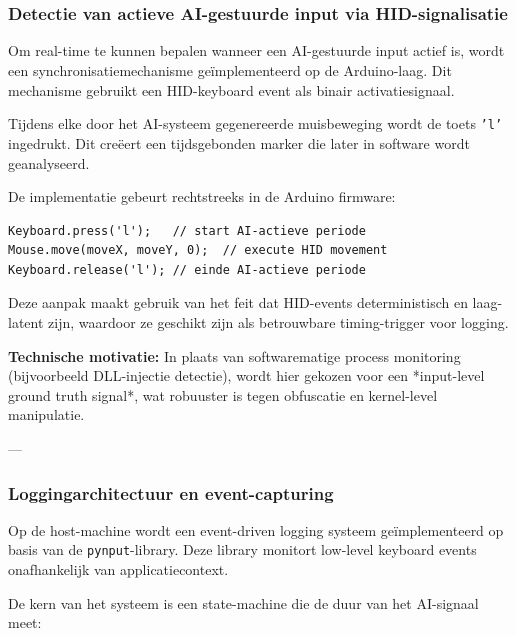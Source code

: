 \chapter{}
\label{ch:Detectie-van-valsspelen-via-machine-learning}

\subsection{Detectie van actieve AI-gestuurde input via HID-signalisatie}

Om real-time te kunnen bepalen wanneer een AI-gestuurde input actief is, wordt een synchronisatiemechanisme geïmplementeerd op de Arduino-laag. Dit mechanisme gebruikt een HID-keyboard event als binair activatiesignaal.

Tijdens elke door het AI-systeem gegenereerde muisbeweging wordt de toets \texttt{'l'} ingedrukt. Dit creëert een tijdsgebonden marker die later in software wordt geanalyseerd.

De implementatie gebeurt rechtstreeks in de Arduino firmware:

\begin{verbatim}
Keyboard.press('l');   // start AI-actieve periode
Mouse.move(moveX, moveY, 0);  // execute HID movement
Keyboard.release('l'); // einde AI-actieve periode
\end{verbatim}

Deze aanpak maakt gebruik van het feit dat HID-events deterministisch en laag-latent zijn, waardoor ze geschikt zijn als betrouwbare timing-trigger voor logging.

\textbf{Technische motivatie:}
In plaats van softwarematige process monitoring (bijvoorbeeld DLL-injectie detectie), wordt hier gekozen voor een *input-level ground truth signal*, wat robuuster is tegen obfuscatie en kernel-level manipulatie.

---

\subsection{Loggingarchitectuur en event-capturing}

Op de host-machine wordt een event-driven logging systeem geïmplementeerd op basis van de \texttt{pynput}-library. Deze library monitort low-level keyboard events onafhankelijk van applicatiecontext.

De kern van het systeem is een state-machine die de duur van het AI-signaal meet:

